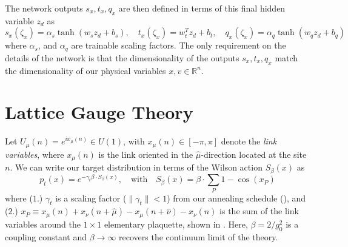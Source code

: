 \documentclass{article} %
\begin{document}
%
The network outputs \(s_{x}, t_{x}, q_{x}\) are then defined in terms of this final hidden variable \(z_{d}\) as
%
\begin{equation}
   s_{x}(\zeta_{x}) = \alpha_{s}\tanh(w_{s}z_{d} + b_{s}),\quad
   t_{x}(\zeta_{x}) = w_{t}^{T}z_{d} + b_{t},\quad
   q_{x}(\zeta_{x}) = \alpha_{q}\tanh(w_{q}z_{d} + b_{q})
\end{equation}
%
where \(\alpha_{s}\), and \(\alpha_{q}\) are trainable scaling factors.
%
The only requirement on the details of the network is that the dimensionality of the outputs \(s_{x}, t_{x}, q_{x}\)
match the dimensionality of our physical variables \(x, v \in\mathbb{R}^{n}\).
%
\section{\label{sec:lattice_gauge_theory}Lattice Gauge Theory}
%
Let \(U_{\mu}(n) = e^{i x_{\mu}(n)} \in U(1)\), with \(x_{\mu}(n) \in [-\pi,\pi]\) denote the \emph{link
variables}, where \(x_{\mu}(n)\) is the link oriented in the \(\hat{\mu}\)-direction located at the site
\(n\).
%
%
%
%
%
We can write our target distribution in terms of the Wilson action \(S_{\beta}(x)\) as
%
\begin{equation}
   p_{t}(x) = e^{-\gamma_{t}\beta\cdot S_{\beta}(x)},\quad\text{with}\quad S_{\beta}(x) = \beta\cdot \sum_{P}1 - \cos(x_{P})
   \label{eq:wilsonaction}
\end{equation}
%
where (\(1\).) \(\gamma_{t}\) is a scaling factor (\(\|\gamma_{t}\|<1\)) from our annealing schedule (), and (\(2\).) \(x_{P} \equiv x_{\mu}(n) + x_{\nu}(n+\hat{\mu}) - x_{\mu}(n+\hat{\nu}) -x_{\nu}(n)\) is the sum of the link
variables around the \(1\times1\) elementary plaquette, shown in .
%
Here, \(\beta = 2 / g_{0}^{2}\) is a coupling constant and \(\beta\rightarrow\infty\) recovers the continuum limit of the theory. 
%
\end{document}
